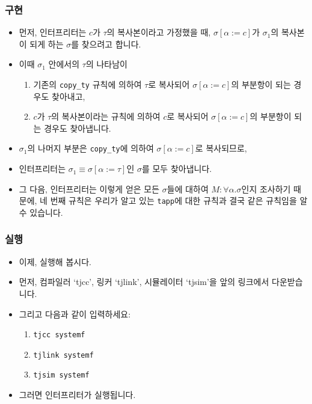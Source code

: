 \documentclass[slidestop,compress,mathserif]{beamer}
\begin{document}
    \begin{frame}
        \frametitle{구현}
        \begin{itemize}
            \item 먼저, 인터프리터는 $c$가 $\tau$의 복사본이라고 가정했을 때, $\sigma \left[ \alpha := c \right]$가 $\sigma_1$의 복사본이 되게 하는 $\sigma$를 찾으려고 합니다.
            \item 이때 $\sigma_1$ 안에서의 $\tau$의 나타남이
            \begin{enumerate}
                \item 기존의 \texttt{copy\_ty} 규칙에 의하여 $\tau$로 복사되어 $\sigma \left[ \alpha := c \right]$의 부분항이 되는 경우도 찾아내고,
                \item $c$가 $\tau$의 복사본이라는 규칙에 의하여 $c$로 복사되어 $\sigma \left[ \alpha := c \right]$의 부분항이 되는 경우도 찾아냅니다.
            \end{enumerate}
            \item $\sigma_1$의 나머지 부분은 \texttt{copy\_ty}에 의하여 $\sigma \left[ \alpha := c \right]$로 복사되므로,
            \item 인터프리터는 $\sigma_1 \equiv \sigma \left[ \alpha := \tau \right]$인 $\sigma$를 모두 찾아냅니다.
            \item 그 다음, 인터프리터는 이렇게 얻은 모든 $\sigma$들에 대하여 $M : \forall \alpha . \sigma$인지 조사하기 때문에, 네 번째 규칙은 우리가 알고 있는 \texttt{tapp}에 대한 규칙과 결국 같은 규칙임을 알 수 있습니다.
        \end{itemize}
    \end{frame}

    \begin{frame}
        \frametitle{실행}
        \begin{itemize}
            \item 이제, 실행해 봅시다.
            \item 먼저, 컴파일러 `tjcc', 링커 `tjlink', 시뮬레이터 `tjsim'을 앞의 링크에서 다운받습니다.
            \item 그리고 다음과 같이 입력하세요:
            \begin{enumerate}
                \item \texttt{tjcc systemf}
                \item \texttt{tjlink systemf}
                \item \texttt{tjsim systemf}
            \end{enumerate}
            \item 그러면 인터프리터가 실행됩니다.
        \end{itemize}
    \end{frame}
\end{document}
